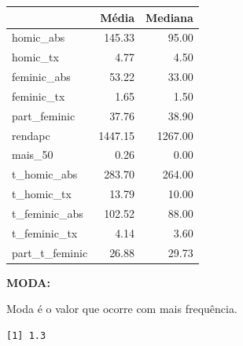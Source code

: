 \documentclass[
  letterpaper,
  DIV=11,
  numbers=noendperiod]{scrreprt}
\newenvironment{Shaded}{\begin{snugshade}}{\end{snugshade}}
\newcommand{\AttributeTok}[1]{\textcolor[rgb]{0.40,0.45,0.13}{#1}}
\newcommand{\ControlFlowTok}[1]{\textcolor[rgb]{0.00,0.23,0.31}{\textbf{#1}}}
\newcommand{\FunctionTok}[1]{\textcolor[rgb]{0.28,0.35,0.67}{#1}}
\newcommand{\NormalTok}[1]{\textcolor[rgb]{0.00,0.23,0.31}{#1}}
\newcommand{\OtherTok}[1]{\textcolor[rgb]{0.00,0.23,0.31}{#1}}
\newcommand{\SpecialCharTok}[1]{\textcolor[rgb]{0.37,0.37,0.37}{#1}}
\begin{document}
\begin{table}
\centering
\begin{tabular}[t]{l|r|r}
\hline
  & Média & Mediana\\
\hline
homic\_abs & 145.33 & 95.00\\
\hline
homic\_tx & 4.77 & 4.50\\
\hline
feminic\_abs & 53.22 & 33.00\\
\hline
feminic\_tx & 1.65 & 1.50\\
\hline
part\_feminic & 37.76 & 38.90\\
\hline
rendapc & 1447.15 & 1267.00\\
\hline
mais\_50 & 0.26 & 0.00\\
\hline
t\_homic\_abs & 283.70 & 264.00\\
\hline
t\_homic\_tx & 13.79 & 10.00\\
\hline
t\_feminic\_abs & 102.52 & 88.00\\
\hline
t\_feminic\_tx & 4.14 & 3.60\\
\hline
part\_t\_feminic & 26.88 & 29.73\\
\hline
\end{tabular}
\end{table}

\textbf{MODA:}

Moda é o valor que ocorre com mais frequência.

\begin{Shaded}
\end{Shaded}

\begin{verbatim}
[1] 1.3
\end{verbatim}
\end{document}
